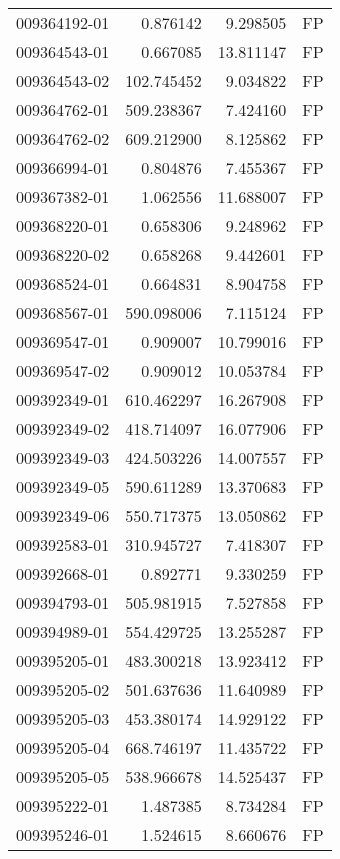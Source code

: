 \begin{tabular}{lrrl}
009364192-01 &    0.876142 &     9.298505 &   FP \\
009364543-01 &    0.667085 &    13.811147 &   FP \\
009364543-02 &  102.745452 &     9.034822 &   FP \\
009364762-01 &  509.238367 &     7.424160 &   FP \\
009364762-02 &  609.212900 &     8.125862 &   FP \\
009366994-01 &    0.804876 &     7.455367 &   FP \\
009367382-01 &    1.062556 &    11.688007 &   FP \\
009368220-01 &    0.658306 &     9.248962 &   FP \\
009368220-02 &    0.658268 &     9.442601 &   FP \\
009368524-01 &    0.664831 &     8.904758 &   FP \\
009368567-01 &  590.098006 &     7.115124 &   FP \\
009369547-01 &    0.909007 &    10.799016 &   FP \\
009369547-02 &    0.909012 &    10.053784 &   FP \\
009392349-01 &  610.462297 &    16.267908 &   FP \\
009392349-02 &  418.714097 &    16.077906 &   FP \\
009392349-03 &  424.503226 &    14.007557 &   FP \\
009392349-05 &  590.611289 &    13.370683 &   FP \\
009392349-06 &  550.717375 &    13.050862 &   FP \\
009392583-01 &  310.945727 &     7.418307 &   FP \\
009392668-01 &    0.892771 &     9.330259 &   FP \\
009394793-01 &  505.981915 &     7.527858 &   FP \\
009394989-01 &  554.429725 &    13.255287 &   FP \\
009395205-01 &  483.300218 &    13.923412 &   FP \\
009395205-02 &  501.637636 &    11.640989 &   FP \\
009395205-03 &  453.380174 &    14.929122 &   FP \\
009395205-04 &  668.746197 &    11.435722 &   FP \\
009395205-05 &  538.966678 &    14.525437 &   FP \\
009395222-01 &    1.487385 &     8.734284 &   FP \\
009395246-01 &    1.524615 &     8.660676 &   FP \\

\end{tabular}
